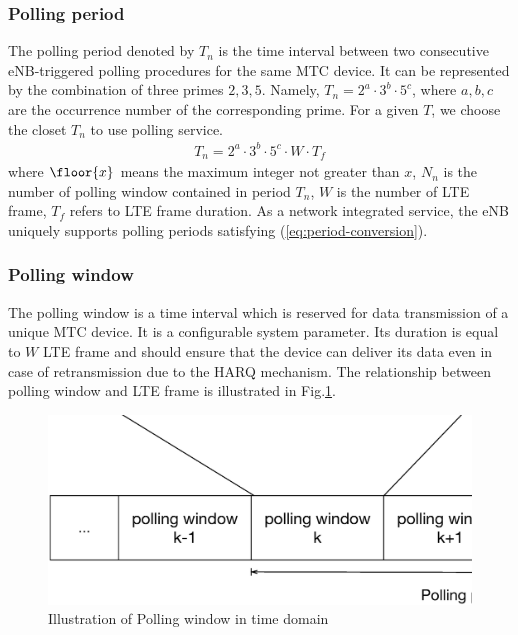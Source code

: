 \subsubsection{{Polling period}}
\label{polling-period}
The polling period denoted by $T_n$ is the time interval between two consecutive eNB-triggered polling procedures for the same MTC device. It can be represented by the combination of three primes $2,3,5$. Namely, $T_n =  2^{a} \cdot 3^{b} \cdot 5^{c}$, where $a, b, c$ are the occurrence number of the corresponding prime. For a given $T$, we choose the closet $T_n$ to use polling service.
\begin{align}
T_{n} = 2^{a} \cdot 3^{b} \cdot 5^{c}\cdot W \cdot T_f\label{eq:period-conversion}
\end{align}
where $\floor{x}$ means the maximum integer not greater than $x$, $N_{n}$ is the number of polling window contained in period $T_{n}$, $W$ is the number of LTE frame, $T_{f}$ refers to LTE frame duration. As a network integrated service, the eNB uniquely supports polling periods satisfying (\ref{eq:period-conversion}). 


\subsubsection{Polling window}
\label{polling-window}
The polling window is a time interval which is reserved for data transmission of a unique MTC device. It is a configurable system parameter. Its duration is equal to $W$ LTE frame and should ensure that the device can deliver its data even in case of retransmission due to the HARQ mechanism.
The relationship between polling window and LTE frame is illustrated in Fig.\ref{fig:Illustration of Polling window in time domain}. 

\begin{figure}[!t]
	\centering
	\includegraphics[width=0.9\linewidth]{Chapter6/Figures/Polling_window_illustration.eps}
	\caption{Illustration of Polling window in time domain}
	\label{fig:Illustration of Polling window in time domain}
\end{figure}

